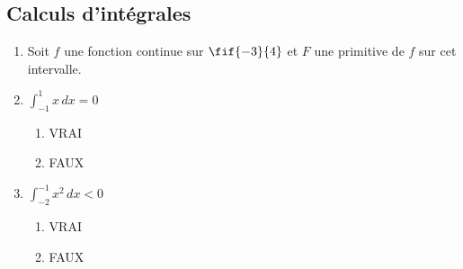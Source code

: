 \documentclass[a4paper,11pt,exos]{nsi} %
\begin{document}
\subsection*{Calculs d'intégrales}
\begin{enumerate}
	\item Soit $f$ une fonction continue sur $\fif{-3}{4}$ et $F$ une primitive de $f$ sur cet intervalle.
	\begin{multicols}{2}
	\end{multicols}
	
	\item $\displaystyle \int_{-1}^{1} x \, dx = 0$
	\begin{multicols}{4}
		\begin{enumerate}[label=\ding{111}]
			\item VRAI
			\item FAUX
		\end{enumerate}
	\end{multicols}
	\item $\displaystyle \int_{-2}^{-1} x^2 \, dx < 0$	
	\begin{multicols}{4}
		\begin{enumerate}[label=\ding{111}]
			\item VRAI
			\item FAUX
		\end{enumerate}
	\end{multicols}
\end{enumerate}
\end{document}
